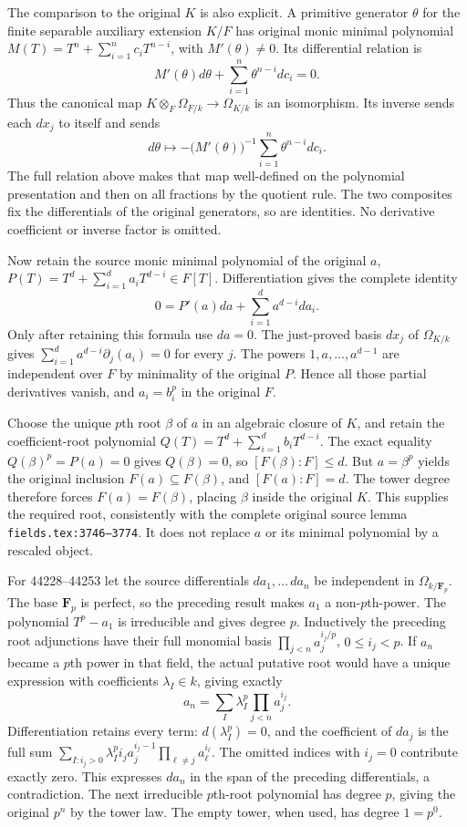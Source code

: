 The comparison to the original \(K\) is also explicit. A primitive generator \(\theta\) for the finite separable auxiliary extension \(K/F\) has original monic minimal polynomial \(M(T)=T^n+\sum_{i=1}^n c_iT^{n-i}\), with \(M'(\theta)\ne0\). Its differential relation is \[
 M'(\theta)d\theta+\sum_{i=1}^n\theta^{n-i}dc_i=0.
\] Thus the canonical map \(K\otimes_F\Omega_{F/k}\to\Omega_{K/k}\) is an isomorphism. Its inverse sends each \(dx_j\) to itself and sends \[
 d\theta\longmapsto-\bigl(M'(\theta)\bigr)^{-1}
                         \sum_{i=1}^n\theta^{n-i}dc_i.
\] The full relation above makes that map well-defined on the polynomial presentation and then on all fractions by the quotient rule. The two composites fix the differentials of the original generators, so are identities. No derivative coefficient or inverse factor is omitted.

Now retain the source monic minimal polynomial of the original \(a\), \(P(T)=T^d+\sum_{i=1}^d a_iT^{d-i}\in F[T]\). Differentiation gives the complete identity \[
 0=P'(a)da+\sum_{i=1}^d a^{d-i}da_i.
\] Only after retaining this formula use \(da=0\). The just-proved basis \(dx_j\) of \(\Omega_{K/k}\) gives \(\sum_{i=1}^d a^{d-i}\partial_j(a_i)=0\) for every \(j\). The powers \(1,a,\ldots,a^{d-1}\) are independent over \(F\) by minimality of the original \(P\). Hence all those partial derivatives vanish, and \(a_i=b_i^p\) in the original \(F\).

Choose the unique \(p\)th root \(\beta\) of \(a\) in an algebraic closure of \(K\), and retain the coefficient-root polynomial \(Q(T)=T^d+\sum_{i=1}^d b_iT^{d-i}\). The exact equality \(Q(\beta)^p=P(a)=0\) gives \(Q(\beta)=0\), so \([F(\beta):F]\leq d\). But \(a=\beta^p\) yields the original inclusion \(F(a)\subseteq F(\beta)\), and \([F(a):F]=d\). The tower degree therefore forces \(F(a)=F(\beta)\), placing \(\beta\) inside the original \(K\). This supplies the required root, consistently with the complete original source lemma \texttt{fields.\AlgebraIdentifierBreak{}tex:\AlgebraIdentifierBreak{}3746–\AlgebraIdentifierBreak{}3774}. It does not replace \(a\) or its minimal polynomial by a rescaled object.

For 44228--44253 let the source differentials \(da_1,\ldots\,da_n\) be independent in \(\Omega_{k/\mathbf F_p}\). The base \(\mathbf F_p\) is perfect, so the preceding result makes \(a_1\) a non-\(p\)th-power. The polynomial \(T^p-a_1\) is irreducible and gives degree \(p\). Inductively the preceding root adjunctions have their full monomial basis \(\prod_{j<n}a_j^{i_j/p}\), \(0\leq i_j<p\). If \(a_n\) became a \(p\)th power in that field, the actual putative root would have a unique expression with coefficients \(\lambda_I\in k\), giving exactly \[
 a_n=\sum_I\lambda_I^p\prod_{j<n}a_j^{i_j}.
\] Differentiation retains every term: \(d(\lambda_I^p)=0\), and the coefficient of \(da_j\) is the full sum \(\sum_{I:i_j>0}\lambda_I^p i_j a_j^{i_j-1}\prod_{\ell\ne j}a_\ell^{i_\ell}\). The omitted indices with \(i_j=0\) contribute exactly zero. This expresses \(da_n\) in the span of the preceding differentials, a contradiction. The next irreducible \(p\)th-root polynomial has degree \(p\), giving the original \(p^n\) by the tower law. The empty tower, when used, has degree \(1=p^0\).

